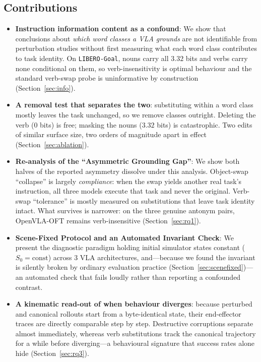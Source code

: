 \documentclass[11pt]{article}
\begin{document}
\subsection*{Contributions}
\begin{itemize}
    \item \textbf{Instruction information content as a confound}: We show that
    conclusions about \emph{which word classes a VLA grounds} are not identifiable
    from perturbation studies without first measuring what each word class
    contributes to task identity. On \texttt{LIBERO-Goal}, nouns carry all $3.32$
    bits and verbs carry none conditional on them, so verb-insensitivity is
    optimal behaviour and the standard verb-swap probe is uninformative by
    construction (Section~\ref{sec:info}).
    \item \textbf{A removal test that separates the two}: substituting within a word
    class mostly leaves the task unchanged, so we remove classes outright. Deleting
    the verb ($0$ bits) is free; masking the nouns ($3.32$ bits) is catastrophic.
    Two edits of similar surface size, two orders of magnitude apart in effect
    (Section~\ref{sec:ablation}).
    \item \textbf{Re-analysis of the ``Asymmetric Grounding Gap''}: We show both
    halves of the reported asymmetry dissolve under this analysis. Object-swap
    ``collapse'' is largely \emph{compliance}: when the swap yields another real
    task's instruction, all three models execute that task and never the original.
    Verb-swap ``tolerance'' is mostly measured on substitutions that leave task
    identity intact. What survives is narrower: on the three genuine antonym pairs,
    OpenVLA-OFT remains verb-insensitive (Section~\ref{sec:rq1}).
    \item \textbf{Scene-Fixed Protocol and an Automated Invariant Check}: We
    present the diagnostic paradigm holding initial simulator states constant
    ($S_0 = \text{const}$) across 3 VLA architectures, and---because we found the
    invariant is silently broken by ordinary evaluation practice
    (Section~\ref{sec:scenefixed})---an automated check that fails loudly rather
    than reporting a confounded contrast.
    \item \textbf{A kinematic read-out of when behaviour diverges}: because
    perturbed and canonical rollouts start from a byte-identical state, their
    end-effector traces are directly comparable step by step. Destructive
    corruptions separate almost immediately, whereas verb substitutions track the
    canonical trajectory for a while before diverging---a behavioural signature
    that success rates alone hide (Section~\ref{sec:rq3}).
\end{itemize}
\end{document}
